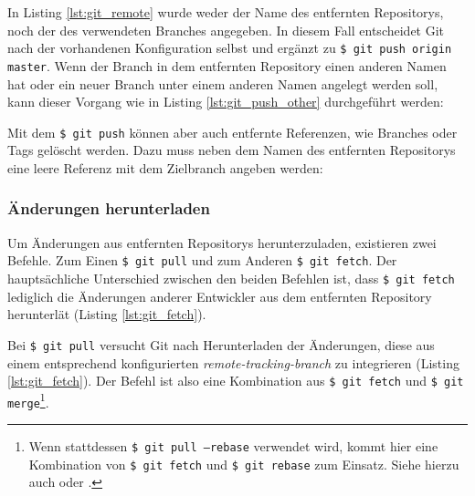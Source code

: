 
In Listing \ref{lst:git_remote} wurde weder der Name des entfernten Repositorys,
noch der des verwendeten Branches angegeben. In diesem Fall entscheidet Git
nach der vorhandenen Konfiguration selbst und ergänzt zu \texttt{\$ git
push origin master}. Wenn der Branch in dem entfernten Repository einen anderen
Namen hat oder ein neuer Branch unter einem anderen Namen angelegt werden soll,
kann dieser Vorgang wie in Listing \ref{lst:git_push_other} durchgeführt werden:


Mit dem \texttt{\$ git push} können aber auch entfernte Referenzen, wie
Branches oder Tags gelöscht werden. Dazu muss neben dem Namen des entfernten
Repositorys eine leere Referenz mit dem Zielbranch angeben werden:
 \cite[S.~153-155]{gitosp}


\subsubsection{Änderungen herunterladen}
Um Änderungen aus entfernten Repositorys herunterzuladen, existieren zwei
Befehle. Zum Einen \texttt{\$ git pull} und zum Anderen \texttt{\$ git fetch}.
Der hauptsächliche Unterschied zwischen den beiden Befehlen ist, dass
\texttt{\$ git fetch} lediglich die Änderungen anderer Entwickler aus dem entfernten
Repository herunterlät (Listing \ref{lst:git_fetch}).


Bei \texttt{\$ git pull} versucht Git nach Herunterladen der
Änderungen, diese aus einem entsprechend konfigurierten
\textit{remote-tracking-branch} zu integrieren (Listing \ref{lst:git_fetch}).
Der Befehl ist also eine Kombination aus \texttt{\$ git fetch} und \texttt{\$
git merge}\footnote{Wenn stattdessen \texttt{\$ git pull --rebase} verwendet
wird, kommt hier eine Kombination von \texttt{\$ git fetch} und \texttt{\$ git
rebase} zum Einsatz. Siehe hierzu auch \cite[144-152]{gitosp} oder
\cite[85-88]{progit}.}. \cite[144-152]{gitosp}


